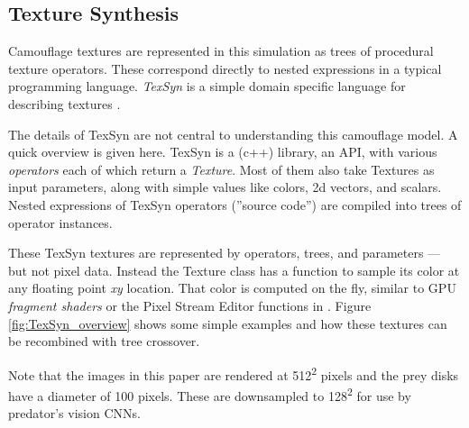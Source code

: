 \documentclass[letterpaper]{article}
\newcommand{\jargon}[1]{\textit{#1}}
\newcommand{\texsyn}[0]{TexSyn}
\newcommand{\runID}{\footnotesize}
\newcommand{\igfour}[1]{\texttt{[image: \#1]}}
\begin{document}

\subsection{Texture Synthesis}
\label{subsec:texture_synthesis}
Camouflage textures are represented in this simulation as trees of procedural texture operators. These correspond directly to nested expressions in a typical programming language. \jargon{\texsyn{}} is a simple domain specific language for describing textures \citep{reynolds_texsyn_2019}.
\par
The details of \texsyn{} are not central to understanding this camouflage model. A quick overview is given here. \texsyn{} is a (c++) library, an API, with various \jargon{operators} each of which return a \jargon{Texture}. Most of them also take Textures as input parameters, along with simple values like colors, 2d vectors, and scalars. Nested expressions of \texsyn{} operators (''source code'') are compiled into trees of operator instances.
\par
These \texsyn{} textures are represented by operators, trees, and parameters --- but not pixel data. Instead the Texture class has a function to sample its color at any floating point \textit{xy} location. That color is computed on the fly, similar to GPU \jargon{fragment shaders} or the Pixel Stream Editor functions in \citet{perlin_image_1985}. Figure \ref{fig:TexSyn_overview} shows some simple examples and how these textures can be recombined with tree crossover.
\par
Note that the images in this paper are rendered at 512\textsuperscript{2} pixels and the prey disks have a diameter of 100 pixels. These are downsampled to 128\textsuperscript{2} for use by predator's vision CNNs. 
\par



\end{document}
